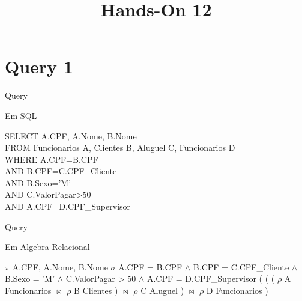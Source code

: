 \documentclass[aspectratio=169]{beamer}
\title{Hands-On 12}
\begin{document}
    \begin{frame}

    \titlepage

    

    \end{frame}



    \section{Query 1}

    \begin{frame}{Query}
     
      Em SQL

      \begin{flushleft}
          SELECT A.CPF, A.Nome, B.Nome \\
          FROM Funcionarios A, Clientes B, Aluguel C, Funcionarios D \\
          WHERE A.CPF=B.CPF \\
          AND B.CPF=C.CPF\_Cliente \\
          AND B.Sexo='M' \\
          AND C.ValorPagar>50 \\
          AND A.CPF=D.CPF\_Supervisor \\
      \end{flushleft}

    \end{frame}

    \begin{frame}{Query}
  
      Em Algebra Relacional
      \begin{flushleft}
        $\pi$ A.CPF, A.Nome, B.Nome $\sigma$ A.CPF = B.CPF $\wedge$ B.CPF = C.CPF\_Cliente $\wedge$ B.Sexo = 'M' $\wedge$ C.ValorPagar > 50 $\wedge$ A.CPF = D.CPF\_Supervisor ( ( ( $\rho$ A Funcionarios $\bowtie$ $\rho$ B Clientes ) $\bowtie$ $\rho$ C Aluguel ) $\bowtie$ $\rho$ D Funcionarios ) 
      \end{flushleft}
    \end{frame}
    
\end{document}
